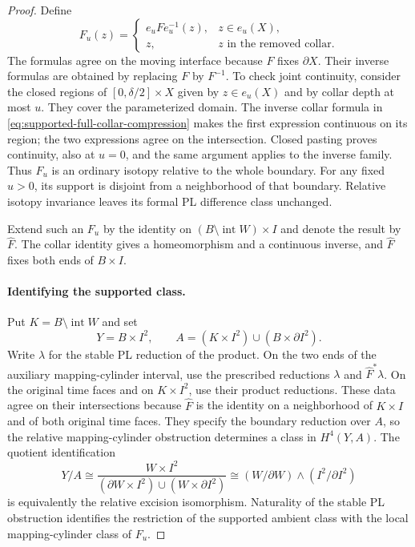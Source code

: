 \begin{proof}
Define
\[
 F_u(z)=
 \begin{cases}
   e_uF e_u^{-1}(z),&z\in e_u(X),\\
   z,&z\text{ in the removed collar}.
 \end{cases}
\]
The formulas agree on the moving interface because $F$
fixes $\partial X$.  Their inverse formulas are obtained
by replacing $F$ by $F^{-1}$.  To check joint continuity,
consider the closed regions of $[0,\delta/2]\times X$
given by $z\in e_u(X)$ and by collar depth at most $u$.
They cover the parameterized domain.  The inverse collar
formula in \eqref{eq:supported-full-collar-compression}
makes the first expression continuous on its region;
the two expressions agree on the intersection.  Closed
pasting proves continuity, also at $u=0$, and the same
argument applies to the inverse family.  Thus $F_u$ is
an ordinary isotopy relative to the whole boundary.
For any fixed $u>0$, its support is disjoint from a
neighborhood of that boundary.  Relative isotopy
invariance leaves its formal PL difference class unchanged.

Extend such an $F_u$ by the identity on
$(B\setminus\operatorname{int}W)\times I$ and denote the
result by $\widehat F$.  The collar identity gives a
homeomorphism and a continuous inverse, and
$\widehat F$ fixes both ends of $B\times I$.

\paragraph{Identifying the supported class.}
Put $K=B\setminus\operatorname{int}W$ and set
\[
 Y=B\times I^2,\qquad
 A=(K\times I^2)\cup(B\times\partial I^2).
\]
Write $\lambda$ for the stable PL reduction of the product.
On the two ends of the auxiliary mapping-cylinder interval, use
the prescribed reductions $\lambda$ and
$\widehat F^{*}\lambda$.  On the original time faces and on
$K\times I^2$, use their product reductions.  These data agree
on their intersections because $\widehat F$ is the identity
on a neighborhood of $K\times I$ and of both original time
faces.  They specify the boundary reduction over $A$, so the
relative mapping-cylinder obstruction determines a class
in $H^4(Y,A)$.
The quotient identification
\begin{equation}\label{eq:supported-three-relative-pair}
 Y/A\cong
 \frac{W\times I^2}
      {(\partial W\times I^2)\cup(W\times\partial I^2)}
 \cong (W/\partial W)\wedge(I^2/\partial I^2)
\end{equation}
is equivalently the relative excision isomorphism.
Naturality of the stable PL obstruction identifies the
restriction of the supported ambient class with the
local mapping-cylinder class of $F_u$.


\end{proof}
